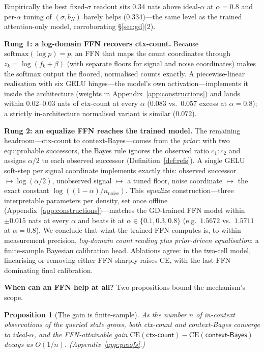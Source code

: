 \documentclass{article} %
\newtheorem{proposition}{Proposition}
\newcommand{\ctxcount}{\textsf{ctx-count}}
\newcommand{\ctxbayes}{\textsf{context-Bayes}}
\newcommand{\idealalpha}{\textsf{ideal-$\alpha$}}
\newcommand{\nnoise}{n_{\mathrm{noise}}}
\begin{document}
Empirically the best fixed-$\sigma$ readout sits $0.34$ nats above \idealalpha{} at
$\alpha=0.8$ and per-$\alpha$ tuning of $(\sigma,b_N)$ barely helps ($0.334$)---the
same level as the trained attention-only model, corroborating \S\ref{sec:gd}(2).

\textbf{Rung 1: a log-domain FFN recovers \ctxcount{}.} Because
$\mathrm{softmax}(\log p)=p$, an FFN that maps the count coordinates through
$z_k=\log(f_k+\beta)$ (with separate floors for signal and noise coordinates) makes
the softmax output the floored, normalised counts exactly. A piecewise-linear
realisation with six GELU hinges---the model's own activation---implements it inside
the architecture (weights in Appendix~\ref{app:constructions}) and lands within
$0.02$--$0.03$ nats of \ctxcount{} at every $\alpha$ ($0.083$ vs.\ $0.057$ excess at
$\alpha=0.8$); a strictly in-architecture normalised variant is similar ($0.072$).

\textbf{Rung 2: an equalize FFN reaches the trained model.} The remaining
headroom---\ctxcount{} to \ctxbayes{}---comes from the \emph{prior}: with two
equiprobable successors, the Bayes rule ignores the observed ratio $c_1\!:\!c_2$ and
assigns $\alpha/2$ to each observed successor (Definition~\ref{def:refs}). A single
GELU soft-step per signal coordinate implements exactly this: observed successor
$\mapsto \log(\alpha/2)$, unobserved signal $\mapsto$ a tuned floor, noise coordinate
$\mapsto$ the exact constant $\log((1-\alpha)/\nnoise)$. This \emph{equalize}
construction---three interpretable parameters per density, set once offline
(Appendix~\ref{app:constructions})---matches the GD-trained FFN model within
$\pm0.015$ nats at every $\alpha$ and beats it at $\alpha\in\{0.1,0.3,0.8\}$ (e.g.\
$1.5672$ vs.\ $1.5711$ at $\alpha=0.8$). We conclude that what the trained FFN
computes is, to within measurement precision, \emph{log-domain count reading plus
prior-driven equalisation}: a finite-sample Bayesian calibration head. Ablations
agree: in the two-cell model, linearising or removing either FFN sharply raises CE,
with the last FFN dominating final calibration.

\textbf{When can an FFN help at all?} Two propositions bound the mechanism's scope.

\begin{proposition}[The gain is finite-sample]\label{prop:infinite}
As the number $n$ of in-context observations of the queried state grows, both
\ctxcount{} and \ctxbayes{} converge to \idealalpha{}, and the FFN-attainable gain
$\mathrm{CE}(\ctxcount)-\mathrm{CE}(\ctxbayes)$ decays as $O(1/n)$.
(Appendix~\ref{app:proofs}.)
\end{proposition}
\end{document}
